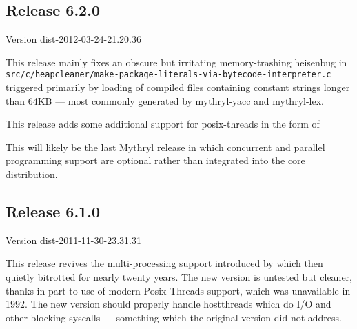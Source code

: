 \cutend*



\subsection{Release 6.2.0}
\label{section:src:release-6.2.0}

Version dist-2012-03-24-21.20.36

This release mainly fixes an obscure but irritating memory-trashing heisenbug 
in {\tt src/c/heapcleaner/make-package-literals-via-bytecode-interpreter.c} 
triggered primarily by loading of compiled files containing constant strings 
longer than 64KB --- most commonly generated by mythryl-yacc and mythryl-lex. 

This release adds some additional support for posix-threads in the form of\newline
{}\newline
{}\newline
{}\newline

This will likely be the last Mythryl release in which concurrent and parallel  
programming support are optional rather than integrated into the core distribution.

\cutend*


\subsection{Release 6.1.0}
\label{section:src:release-6.1.0}

Version dist-2011-11-30-23.31.31 

This release revives the multi-processing support introduced by 
which then quietly bitrotted for nearly twenty years.  The new version is untested but cleaner, thanks in part 
to use of modern Posix Threads support, which was unavailable in 1992.  The new version should properly handle hostthreads which 
do I/O and other blocking syscalls --- something which the original version did not address. 

